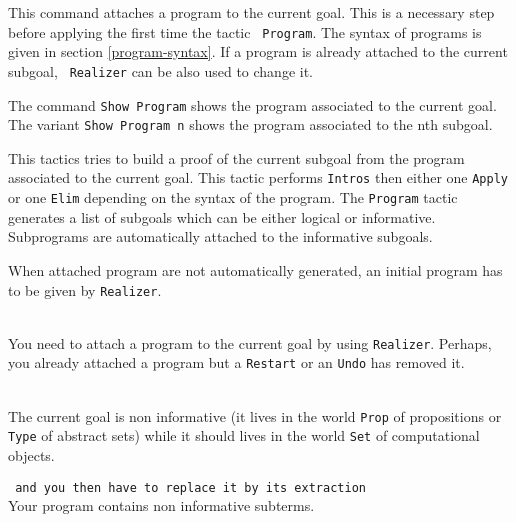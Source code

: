 \label{Realizer}
This command attaches a program {\term} to the current goal. This is a
necessary step before applying the first time the tactic {\tt
Program}.  The syntax of programs is given in section \ref{program-syntax}.
If a program is already attached to the current subgoal, {\tt
Realizer} can be also used to change it.

\label{Show Program} 
The command \verb=Show Program= shows the program associated to the
current goal. The variant \verb=Show Program n= shows the program associated to
the nth subgoal.

\label{Program} 
This tactics tries to build a proof of the current subgoal from the
program associated to the current goal. This tactic performs
\verb=Intros= then either one \verb=Apply= or one \verb=Elim=
depending on the syntax of the program. The \verb=Program= tactic
generates a list of subgoals which can be either logical or
informative. Subprograms are automatically attached to the informative
subgoals. 

When attached program are not automatically generated, an initial program
has to be given by {\tt Realizer}. 

\begin{ErrMsgs}
\item {}\\
You need to attach a program to the current goal by using {\tt Realizer}.
Perhaps, you already attached a program but a {\tt Restart} or an
{\tt Undo} has removed it.
\item {}
\item {}\\
The current goal is non informative (it lives in the world {\tt Prop}
of propositions or {\tt Type} of abstract sets) while it should lives
in the world {\tt Set} of computational objects.
\item {}\texttt{ and you then have to replace it by its extraction}\\
Your program contains non informative subterms.
\end{ErrMsgs}


